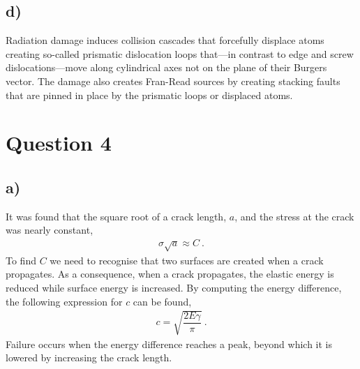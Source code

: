\documentclass[a4paper]{article}
\begin{document}
	\subsection{d)}
	Radiation damage induces collision cascades that forcefully displace atoms creating so-called prismatic dislocation loops that---in contrast to edge and screw dislocations---move along cylindrical axes not on the plane of their Burgers vector. The damage also creates Fran-Read sources by creating stacking faults that are pinned in place by the prismatic loops or displaced atoms.
	
	\section{Question 4}
	\subsection{a)}
	It was found that the square root of a crack length, $a$, and the stress at the crack was nearly constant,
	\begin{align}
		\sigma \sqrt{a} \approx C~. \label{f:griffith1}
	\end{align}
	To find $C$ we need to recognise that two surfaces are created when a crack propagates. As a consequence, when a crack propagates, the elastic energy is reduced while surface energy is increased. By computing the energy difference, the following expression for $c$ can be found,
	\begin{align}
		c = \sqrt{\dfrac{2 E \gamma}{\pi}}~.
	\end{align}
	Failure occurs when the energy difference reaches a peak, beyond which it is lowered by increasing the crack length.
\end{document}
